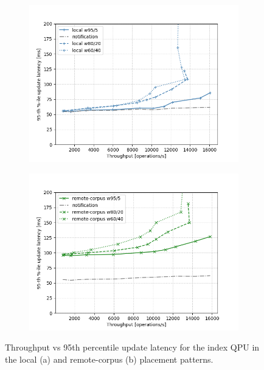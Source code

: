 \begin{figure}[H]
  \begin{subfigure}{0.5\textwidth}
    \includegraphics[width=\linewidth]{./figures/evaluation/ycsb_update_latency_local.png}
    \caption{}
    \label{fig:ycsb_update_latency_local}
  \end{subfigure}%
  \hspace*{\fill}
  \begin{subfigure}{0.5\textwidth}
    \includegraphics[width=\linewidth]{./figures/evaluation/ycsb_update_latency_remote.png}
    \caption{}
    \label{fig:ycsb_update_latency_remote}
  \end{subfigure}%
  \caption{Throughput vs 95th percentile update latency for the index QPU in the local (a) and remote-corpus (b) placement patterns.}
  \label{fig:ycsb_update_latency_local_local_remote}
\end{figure}

